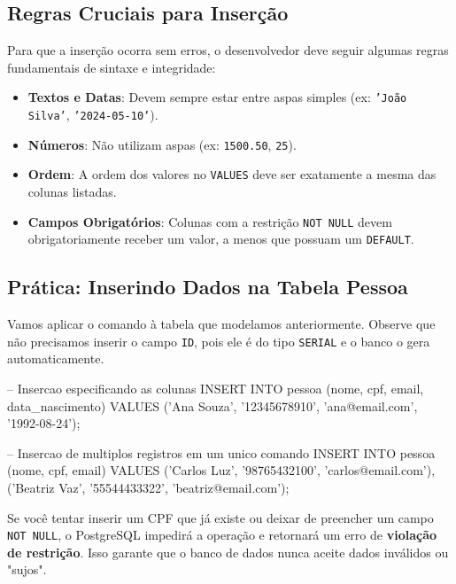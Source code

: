 \subsection{Regras Cruciais para Inserção}

Para que a inserção ocorra sem erros, o desenvolvedor deve seguir algumas regras fundamentais de sintaxe e integridade:

\begin{itemize}
    \item \textbf{Textos e Datas}: Devem sempre estar entre aspas simples (ex: \texttt{'João Silva'}, \texttt{'2024-05-10'}).
    \item \textbf{Números}: Não utilizam aspas (ex: \texttt{1500.50}, \texttt{25}).
    \item \textbf{Ordem}: A ordem dos valores no \texttt{VALUES} deve ser exatamente a mesma das colunas listadas.
    \item \textbf{Campos Obrigatórios}: Colunas com a restrição \texttt{NOT NULL} devem obrigatoriamente receber um valor, a menos que possuam um \texttt{DEFAULT}.
\end{itemize}

\subsection{Prática: Inserindo Dados na Tabela Pessoa}

Vamos aplicar o comando à tabela que modelamos anteriormente. Observe que não precisamos inserir o campo \texttt{ID}, pois ele é do tipo \texttt{SERIAL} e o banco o gera automaticamente.

\begin{sqlcode}
-- Insercao especificando as colunas
INSERT INTO pessoa (nome, cpf, email, data_nascimento)
VALUES ('Ana Souza', '12345678910', 'ana@email.com', '1992-08-24');

-- Insercao de multiplos registros em um unico comando
INSERT INTO pessoa (nome, cpf, email)
VALUES 
    ('Carlos Luz', '98765432100', 'carlos@email.com'),
    ('Beatriz Vaz', '55544433322', 'beatriz@email.com');
\end{sqlcode}



\begin{tcolorbox}[colback=red!5,colframe=red!40!black,title=Atenção: Erros de Restrição]
Se você tentar inserir um CPF que já existe ou deixar de preencher um campo \texttt{NOT NULL}, o PostgreSQL impedirá a operação e retornará um erro de \textbf{violação de restrição}. Isso garante que o banco de dados nunca aceite dados inválidos ou "sujos".
\end{tcolorbox}

